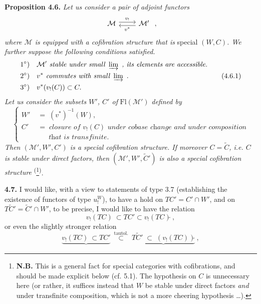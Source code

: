 \documentclass[11pt]{article}
\newcommand{\msp}[1]{\marginpar{\footnotesize [#1]}}
\newcommand{\postilde}{\tilde{}}
\newcommand{\Fl}{\mathrm{Fl}}
\begin{document}
\textbf{Proposition 4.6.} \textit{Let us consider a pair of adjoint functors}
\[
\begin{tikzcd}
\mathcal{M} \arrow[r, shift left, "v_!"] & \mathcal{M}' \arrow[l, shift left, "v^*"]
\end{tikzcd}
\ ,
\]
\textit{where $\mathcal{M}$ is equipped with a cofibration structure that is} special $(W, C)$\textit{. We further suppose the following conditions satisfied.}
\[
\begin{aligned}
&1^\circ)\quad \mathcal{M}' \textit{ stable under small } \varinjlim\ \textit{, its elements are accessible.} \\
&2^\circ)\quad v^* \textit{ commutes with small } \varinjlim\ . \\
&3^\circ)\quad v^*(v_!(C)) \subset C.
\end{aligned} \tag*{(4.6.1)}
\]
\msp{page 79}
\textit{Let us consider the subsets $W'$, $C'$ of} $\Fl(\mathcal{M}')$ \textit{defined by}
\[
\left\{
\begin{aligned}
W' \;&=\; (v^*)^{-1}(W), \\
C' \;&=\; \textit{closure of } v_!(C) \textit{ under cobase change and under composition} \\
&\phantom{\;=\;}\ \textit{that is transfinite.}
\end{aligned}
\right. \tag*{(4.6.2)}
\]
\textit{Then $(\mathcal{M}', W', C')$ is a special cofibration structure. If moreover $C = \tilde{C}$, i.e. $C$ is stable under direct factors, then $(\mathcal{M}', W', \tilde{C}')$ is also a special cofibration structure} \textsuperscript{(}\footnote[20]{\textbf{N.B.} This is a general fact for special categories with cofibrations, and should be made explicit below (cf. 5.1). The hypothesis on $C$ is unnecessary here (or rather, it suffices instead that $W$ be stable under direct factors \textit{and} under transfinite composition, which is not a more cheering hypothesis \dots).}\textsuperscript{)}.

\textbf{4.7.} I would like, with a view to statements of type 3.7 (establishing the existence of functors of type $u_!^W$), to have a hold on $TC' = C'{\cap}W'$, and on $T\tilde{C}' = \tilde{C}'{\cap}W'$, to be precise, I would like to have the relation
\[
v_!(TC)\ \subset TC' \subset v_!(TC)\postilde\ , \tag*{(4.7.1)}
\]
or even the slightly stronger relation
\[
\underbrace{v_!(TC)\ \subset TC'}_{} \ \overset{\text{tautol.}}{\subset}\ \underbrace{T\tilde{C}' \;\subset\; (v_!(TC))\postilde}_{}\ , \tag*{(4.7.2)}
\]
\end{document}
